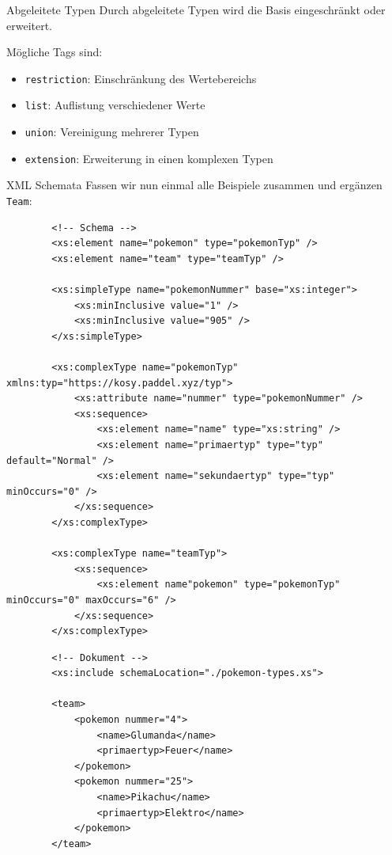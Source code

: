 \begin{bonus}{Abgeleitete Typen}
    Durch abgeleitete Typen wird die Basis eingeschränkt oder erweitert.

    Mögliche Tags sind:

    \begin{itemize}
        \item \texttt{restriction}: Einschränkung des Wertebereichs
        \item \texttt{list}: Auflistung verschiedener Werte
        \item \texttt{union}: Vereinigung mehrerer Typen
        \item \texttt{extension}: Erweiterung in einen komplexen Typen
    \end{itemize}
\end{bonus}

\begin{example}{XML Schemata}
    Fassen wir nun einmal alle Beispiele zusammen und ergänzen \texttt{Team}:

    \begin{lstlisting}
        <!-- Schema -->
        <xs:element name="pokemon" type="pokemonTyp" />
        <xs:element name="team" type="teamTyp" />

        <xs:simpleType name="pokemonNummer" base="xs:integer">
            <xs:minInclusive value="1" />
            <xs:minInclusive value="905" />
        </xs:simpleType>

        <xs:complexType name="pokemonTyp" xmlns:typ="https://kosy.paddel.xyz/typ">
            <xs:attribute name="nummer" type="pokemonNummer" />
            <xs:sequence>
                <xs:element name="name" type="xs:string" />
                <xs:element name="primaertyp" type="typ" default="Normal" />
                <xs:element name="sekundaertyp" type="typ" minOccurs="0" />
            </xs:sequence>
        </xs:complexType>

        <xs:complexType name="teamTyp">
            <xs:sequence>
                <xs:element name"pokemon" type="pokemonTyp" minOccurs="0" maxOccurs="6" />
            </xs:sequence>
        </xs:complexType>
    \end{lstlisting}

    \begin{lstlisting}
        <!-- Dokument -->
        <xs:include schemaLocation="./pokemon-types.xs">

        <team>
            <pokemon nummer="4">
                <name>Glumanda</name>
                <primaertyp>Feuer</name>
            </pokemon>
            <pokemon nummer="25">
                <name>Pikachu</name>
                <primaertyp>Elektro</name>
            </pokemon>
        </team>
    \end{lstlisting}
\end{example}

